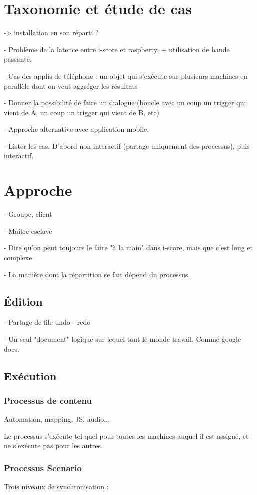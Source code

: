 \documentclass{article}
\begin{document}
\section{Taxonomie et étude de cas}
-> installation en son réparti ?

- Problème de la latence entre i-score et raspberry, + utilisation de bande passante.

- Cas des applis de téléphone : un objet qui s'exécute sur plusieurs machines en parallèle dont on veut aggréger les résultats

- Donner la possibilité de faire un dialogue (boucle avec un coup un trigger qui vient de A, un coup un trigger qui vient de B, etc)

- Approche alternative avec application mobile.

- Lister les cas. D'abord non interactif (partage uniquement des processus), puis interactif.

\section{Approche}
- Groupe, client

- Maître-esclave

- Dire qu'on peut toujours le faire "à la main" dans i-score, mais que c'est long et complexe.

- La manière dont la répartition se fait dépend du processus.

\subsection{Édition}
- Partage de file undo - redo

- Un seul "document" logique sur lequel tout le monde travail. Comme google docs.

\subsection{Exécution}
\subsubsection{Processus de contenu}
Automation, mapping, JS, audio...

Le processus s'exécute tel quel pour toutes les machines auquel il est assigné, 
et ne s'exécute pas pour les autres.

\subsubsection{Processus Scenario}
Trois niveaux de synchronisation : 
\end{document}
